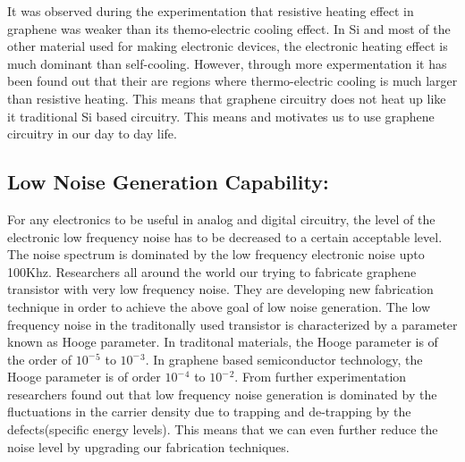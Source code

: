 \documentclass[conference]{IEEEtran}
\begin{document}
It was observed during the experimentation that resistive heating effect in graphene was weaker than its themo-electric cooling effect.
In Si and most of the other material used for making electronic devices, the electronic heating effect is much dominant than self-cooling. However, through more expermentation it has been found out that their are regions where thermo-electric cooling is much larger than resistive heating. This means that graphene circuitry does not heat up like it traditional Si based circuitry. This means and motivates us to use graphene circuitry in our day to day life.
\\

\subsection{\textbf{Low Noise Generation Capability:}}
For any electronics to be useful in analog and digital circuitry, the level of the electronic low frequency noise has to be decreased to a certain acceptable level. The noise spectrum is dominated by the low frequency electronic noise upto 100Khz. Researchers all around the world our trying to fabricate graphene transistor with very low frequency noise. They are developing new fabrication technique in order to achieve the above goal of low noise generation. The low frequency noise in the traditonally used transistor is characterized by a parameter known as Hooge parameter. In traditonal materials, the Hooge parameter is of the order of $10^-$$^5$ to $10^-$$^3$. In graphene based semiconductor technology, the Hooge parameter is of order $10^-$$^4$ to $10^-$$^2$. From further experimentation researchers found out that low frequency noise generation is dominated by the fluctuations in the carrier density due to trapping and de-trapping by the defects(specific energy levels). This means that we can even further reduce the noise level by upgrading our fabrication techniques.
\\
\end{document}
